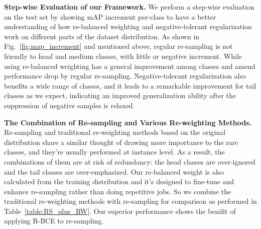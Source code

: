 \documentclass[runningheads]{llncs}
\begin{document}
\noindent\textbf{Step-wise Evaluation of our Framework.}
We perform a step-wise evaluation on the test set by showing mAP increment per-class to have a better understanding of how re-balanced weighting and negative-tolerant regularization work on different parts of the dataset distribution. 
As shown in Fig.~\ref{fig:map_increment} and mentioned above, regular re-sampling is not friendly to head and medium classes, with little or negative increment. While using re-balanced weighting has a general improvement among classes and amend performance drop by regular re-sampling. 
Negative-tolerant regularization also benefits a wide range of classes, and it leads to a remarkable improvement for tail classes as we expect, indicating an improved generalization ability after the suppression of negative samples is relaxed.


\noindent\textbf{The Combination of Re-sampling and Various Re-weighting Methods.}
Re-sampling and traditional re-weighting methods based on the original distribution share a similar thought of drawing more importance to the rare classes, and they're usually performed at instance level. As a result, the combinations of them are at risk of redundancy: the head classes are over-ignored and the tail classes are over-emphasized. 
Our re-balanced weight is also calculated from the training distribution and it's designed to fine-tune and enhance re-sampling rather than doing repetitive jobs.
So we combine the traditional re-weighting methods with re-sampling for comparison as performed in Table~\ref{table:RS_plus_RW}. Our superior performance shows the benifit of applying R-BCE to re-sampling.
\end{document}
